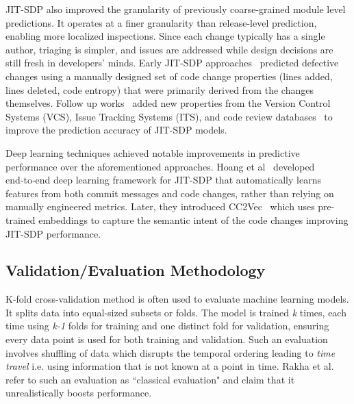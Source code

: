 \documentclass[\main/thesis.tex]{subfiles}
\begin{document}
JIT-SDP also improved the granularity of previously coarse-grained module level predictions. It operates at a finer granularity than release-level prediction, enabling more localized inspections. Since each change typically has a single author, triaging is simpler, and issues are addressed while design decisions are still fresh in developers' minds. Early JIT-SDP approaches~\cite{mockus2000predicting} predicted defective changes using a manually designed set of code change properties (lines added, lines deleted, code entropy) that were primarily derived from the changes themselves. Follow up works~\cite{kim2008classifying,kamei2012large} added new properties from the Version Control Systems (VCS), Issue Tracking Systems (ITS), and code review databases~\cite{kononenko2015investigating} to improve the prediction accuracy of JIT-SDP models.

Deep learning techniques achieved notable improvements in predictive performance over the aforementioned approaches. Hoang et al~\cite{hoang2019deepjit} developed end‑to‑end deep learning framework for JIT-SDP that automatically learns features from both commit messages and code changes, rather than relying on manually engineered metrics. Later, they introduced CC2Vec~\cite{alon2019code2vec} which uses pre-trained embeddings to capture the semantic intent of the code changes improving JIT-SDP performance.  

\subsection{Validation/Evaluation Methodology}
K-fold cross-validation method is often used to evaluate machine learning models. It splits data into 
equal-sized subsets or folds. The model is trained \textit{k} 
times, each time using \textit{k-1}
folds for training and one distinct fold for validation, ensuring every data point is used for both training and validation. Such an evaluation involves shuffling of data which disrupts the temporal ordering leading to \textit{time travel} i.e. using information that is not known at a point in time. Rakha et al.~\cite{rakha2018} refer to such an evaluation as ``classical evaluation" and claim that it unrealistically boosts performance.
 
\end{document}
